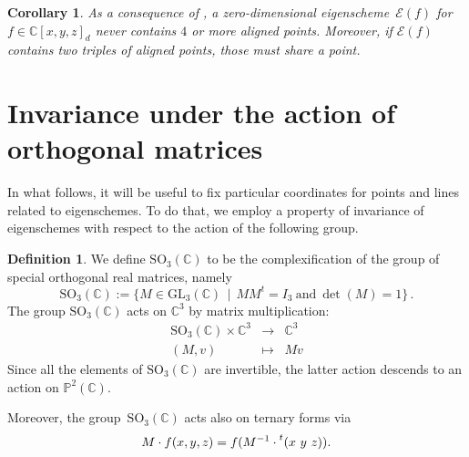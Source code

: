 \documentclass{amsart}
\theoremstyle{plain}
\newtheorem{corollary}[lemma]{Corollary}
\theoremstyle{definition}
\newtheorem{definition}[lemma]{Definition}
\newcommand{\C}{\mathbb{C}}
\newcommand{\p}{\mathbb{P}}
\newcommand{\Eig}[1]{\mathcal{E}\!\left( {#1} \right)}
\begin{document}
\begin{corollary}
\label{corollary:general_no_triple}
As a consequence of , a zero-dimensional eigenscheme~$\Eig{f}$ for $f \in \C[x,y,z]_d$ never contains $4$ or more aligned points.
Moreover, if $\Eig{f}$ contains two triples of aligned points, those must share a point.
\end{corollary}

\section{Invariance under the action of orthogonal matrices}
\label{invariance}

In what follows, it will be useful to fix particular coordinates for points and lines related to eigenschemes. To do that, we employ a property of invariance of eigenschemes with respect to the action of the following group.

\begin{definition}
 We define $\mathrm{SO}_3(\mathbb{C})$ to be the complexification of the group of special orthogonal real matrices, namely
 \[
  \mathrm{SO}_3(\mathbb{C}) :=
  \bigl\{
   M \in \mathrm{GL}_3(\C) \, \mid \,
   M M^t = I_3 \  \text{and} \  \det(M) = 1
  \bigr\} \,.
 \]
 The group $\mathrm{SO}_3(\mathbb{C})$ acts on $\C^3$ by matrix multiplication:
 \[
  \begin{array}{ccc}
   \mathrm{SO}_3(\mathbb{C}) \times \C^3 & \rightarrow & \C^3 \\
   (M, v) & \mapsto & Mv
  \end{array}
 \]
 Since all the elements of $\mathrm{SO}_3(\mathbb{C})$ are invertible, the latter action descends to an action on $\p^2(\C)$.

 Moreover, the group~$\mathrm{SO}_3(\mathbb{C})$ acts also on ternary forms via
 \[
  M \cdot f (x,y,z) = f(M^{-1} \cdot \prescript{t} {}( x \ y \ z )  ).
 \]
\end{definition}
\end{document}
